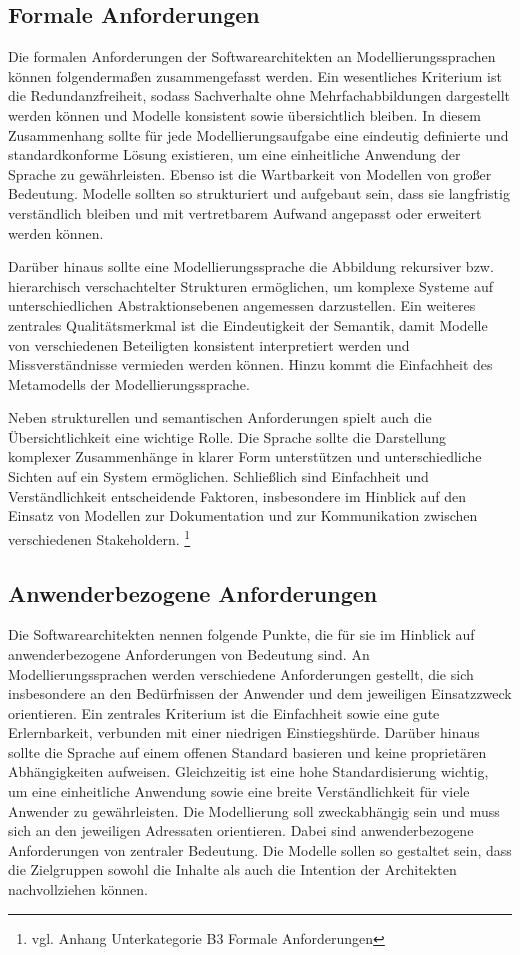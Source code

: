\subsection{Formale Anforderungen}

Die formalen Anforderungen der Softwarearchitekten an Modellierungssprachen können folgendermaßen zusammengefasst werden. 
Ein wesentliches Kriterium ist die Redundanzfreiheit, sodass Sachverhalte ohne Mehrfachabbildungen dargestellt werden können und Modelle konsistent sowie übersichtlich bleiben. In diesem Zusammenhang sollte für jede Modellierungsaufgabe eine eindeutig definierte und standardkonforme Lösung existieren, um eine einheitliche Anwendung der Sprache zu gewährleisten. Ebenso ist die Wartbarkeit von Modellen von großer Bedeutung. Modelle sollten so strukturiert und aufgebaut sein, dass sie langfristig verständlich bleiben und mit vertretbarem Aufwand angepasst oder erweitert werden können.

Darüber hinaus sollte eine Modellierungssprache die Abbildung rekursiver bzw. hierarchisch verschachtelter Strukturen ermöglichen, um komplexe Systeme auf unterschiedlichen Abstraktionsebenen angemessen darzustellen. Ein weiteres zentrales Qualitätsmerkmal ist die Eindeutigkeit der Semantik, damit Modelle von verschiedenen Beteiligten konsistent interpretiert werden und Missverständnisse vermieden werden können. Hinzu kommt die Einfachheit des Metamodells der Modellierungssprache.

Neben strukturellen und semantischen Anforderungen spielt auch die Übersichtlichkeit eine wichtige Rolle. Die Sprache sollte die Darstellung komplexer Zusammenhänge in klarer Form unterstützen und unterschiedliche Sichten auf ein System ermöglichen. Schließlich sind Einfachheit und Verständlichkeit entscheidende Faktoren, insbesondere im Hinblick auf den Einsatz von Modellen zur Dokumentation und zur Kommunikation zwischen verschiedenen Stakeholdern. \footnote{vgl. Anhang Unterkategorie B3 Formale Anforderungen}

\subsection{Anwenderbezogene Anforderungen}

Die Softwarearchitekten nennen folgende Punkte, die für sie im Hinblick auf anwenderbezogene Anforderungen von Bedeutung sind.
An Modellierungssprachen werden verschiedene Anforderungen gestellt, die sich insbesondere an den Bedürfnissen der Anwender und dem jeweiligen Einsatzzweck orientieren. Ein zentrales Kriterium ist die Einfachheit sowie eine gute Erlernbarkeit, verbunden mit einer niedrigen Einstiegshürde. Darüber hinaus sollte die Sprache auf einem offenen Standard basieren und keine proprietären Abhängigkeiten aufweisen. Gleichzeitig ist eine hohe Standardisierung wichtig, um eine einheitliche Anwendung sowie eine breite Verständlichkeit für viele Anwender zu gewährleisten.
Die Modellierung soll zweckabhängig sein und muss sich an den jeweiligen Adressaten orientieren. Dabei sind anwenderbezogene Anforderungen von zentraler Bedeutung. Die Modelle sollen so gestaltet sein, dass die Zielgruppen sowohl die Inhalte als auch die Intention der Architekten nachvollziehen können. 

